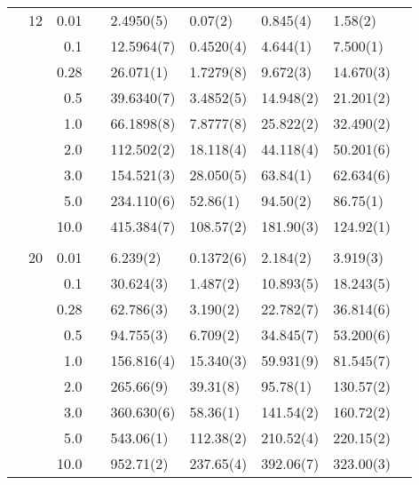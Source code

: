 \begin{table}[H]
\begin{tabularx}{\textwidth}{R{1cm}rrcR{2.3cm}R{2.3cm}R{2.3cm}R{2.3cm}R{1cm}}
		&12 & 0.01 && 2.4950(5) & 0.07(2) & 0.845(4) & 1.58(2) \\
		&& 0.1 && 12.5964(7) & 0.4520(4) & 4.644(1) & 7.500(1) \\
		&& 0.28 && 26.071(1) & 1.7279(8) & 9.672(3) & 14.670(3) \\
		&& 0.5 && 39.6340(7) & 3.4852(5) & 14.948(2) & 21.201(2) \\
		&& 1.0 && 66.1898(8) & 7.8777(8) & 25.822(2) & 32.490(2) \\
		&& 2.0 && 112.502(2) & 18.118(4) & 44.118(4) & 50.201(6) \\
		&& 3.0 && 154.521(3) & 28.050(5) & 63.84(1) & 62.634(6) \\ 
		&& 5.0 && 234.110(6) & 52.86(1) & 94.50(2) & 86.75(1) \\
		&& 10.0 && 415.384(7) & 108.57(2) & 181.90(3) & 124.92(1) \\
		\hdashline \\
		
		&20 & 0.01 && 6.239(2) & 0.1372(6) & 2.184(2) & 3.919(3) \\
		&& 0.1 && 30.624(3) & 1.487(2) & 10.893(5) & 18.243(5) \\
		&& 0.28 && 62.786(3) & 3.190(2) & 22.782(7) & 36.814(6) \\
		&& 0.5 && 94.755(3) & 6.709(2) & 34.845(7) & 53.200(6) \\
		&& 1.0 && 156.816(4) & 15.340(3) & 59.931(9) & 81.545(7) \\
		&& 2.0 && 265.66(9) & 39.31(8) & 95.78(1) & 130.57(2) \\
		&& 3.0 && 360.630(6) & 58.36(1) & 141.54(2) & 160.72(2) \\ 
		&& 5.0 && 543.06(1) & 112.38(2) & 210.52(4) & 220.15(2) \\
		&& 10.0 && 952.71(2) & 237.65(4) & 392.06(7) & 323.00(3) \\
		\hline\hline
	\end{tabularx}
\end{table}

